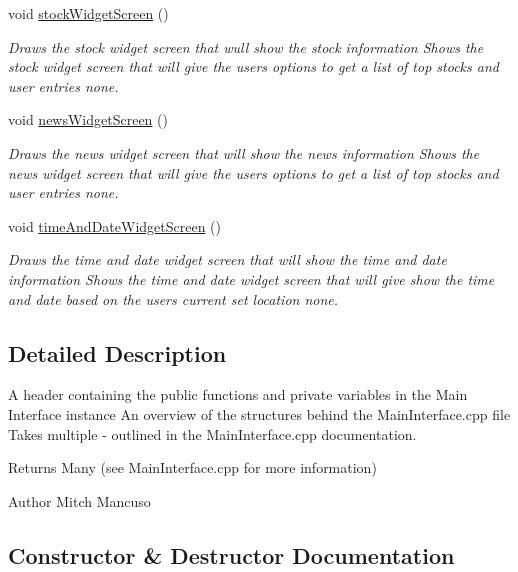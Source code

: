 \begin{DoxyCompactItemize}
void \mbox{\hyperlink{class_main_interface_a34de3c148d9a99f336111ee9c4ba87e0}{stock\+Widget\+Screen}} ()
\begin{DoxyCompactList}\small\item\em Draws the stock widget screen that wull show the stock information  Shows the stock widget screen that will give the users options to get a list of top stocks and user entries  none. \end{DoxyCompactList}\item 
void \mbox{\hyperlink{class_main_interface_aca2ed8a09e281148a1e3d45299384885}{news\+Widget\+Screen}} ()
\begin{DoxyCompactList}\small\item\em Draws the news widget screen that will show the news information  Shows the news widget screen that will give the users options to get a list of top stocks and user entries  none. \end{DoxyCompactList}\item 
void \mbox{\hyperlink{class_main_interface_a1ed374c9076deb2d73626122825bb6f2}{time\+And\+Date\+Widget\+Screen}} ()
\begin{DoxyCompactList}\small\item\em Draws the time and date widget screen that will show the time and date information  Shows the time and date widget screen that will give show the time and date based on the user\textquotesingle{}s current set location  none. \end{DoxyCompactList}\end{DoxyCompactItemize}


\subsection{Detailed Description}
A header containing the public functions and private variables in the Main Interface instance  An overview of the structures behind the Main\+Interface.\+cpp file  Takes multiple -\/ outlined in the Main\+Interface.\+cpp documentation. 

\begin{DoxyReturn}{Returns}
Many (see Main\+Interface.\+cpp for more information) 
\end{DoxyReturn}
\begin{DoxyAuthor}{Author}
Mitch Mancuso 
\end{DoxyAuthor}


\subsection{Constructor \& Destructor Documentation}
\mbox{\label{class_main_interface_a0f52860dc811962028162a5842b796fc}} 
